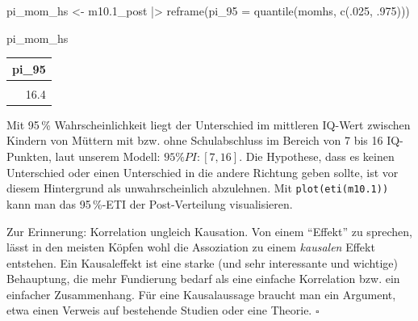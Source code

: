 \documentclass[
  ngerman,
  letterpaper,
  twoside,
  open=any]{scrbook}
\newenvironment{Shaded}{\begin{snugshade}}{\end{snugshade}}
\newcommand{\AttributeTok}[1]{\textcolor[rgb]{0.40,0.45,0.13}{#1}}
\newcommand{\DecValTok}[1]{\textcolor[rgb]{0.68,0.00,0.00}{#1}}
\newcommand{\FloatTok}[1]{\textcolor[rgb]{0.68,0.00,0.00}{#1}}
\newcommand{\FunctionTok}[1]{\textcolor[rgb]{0.28,0.35,0.67}{#1}}
\newcommand{\NormalTok}[1]{\textcolor[rgb]{0.00,0.23,0.31}{#1}}
\newcommand{\OtherTok}[1]{\textcolor[rgb]{0.00,0.23,0.31}{#1}}
\newcommand{\SpecialCharTok}[1]{\textcolor[rgb]{0.37,0.37,0.37}{#1}}
\newcounter{none} %
\theoremstyle{definition}
\theoremstyle{plain}
\theoremstyle{definition}
\theoremstyle{definition}
\theoremstyle{definition}
\theoremstyle{definition}
\theoremstyle{remark}
\begin{document}
\begin{Shaded}
\begin{Highlighting}[]
\NormalTok{pi\_mom\_hs }\OtherTok{\textless{}{-}}
\NormalTok{  m10}\FloatTok{.1}\NormalTok{\_post }\SpecialCharTok{|\textgreater{}}
  \FunctionTok{reframe}\NormalTok{(}\AttributeTok{pi\_95 =} \FunctionTok{quantile}\NormalTok{(momhs, }\FunctionTok{c}\NormalTok{(.}\DecValTok{025}\NormalTok{, .}\DecValTok{975}\NormalTok{)))}

\NormalTok{pi\_mom\_hs}
\end{Highlighting}
\end{Shaded}

{\def\LTcaptype{none} %
\begin{longtable}[]{@{}r@{}}
\toprule\noalign{}
pi\_95 \\
\midrule\noalign{}
\endhead
\bottomrule\noalign{}
\endlastfoot
7.3 \\
16.4 \\
\end{longtable}
}

Mit 95\,\% Wahrscheinlichkeit liegt der Unterschied im mittleren IQ-Wert
zwischen Kindern von Müttern mit bzw. ohne Schulabschluss im Bereich von
7 bis 16 IQ-Punkten, laut unserem Modell: \(95\%PI: [7,16]\). Die
Hypothese, dass es keinen Unterschied oder einen Unterschied in die
andere Richtung geben sollte, ist vor diesem Hintergrund als
unwahrscheinlich abzulehnen. Mit \texttt{plot(eti(m10.1))} kann man das
95\,\%-ETI der Post-Verteilung visualisieren.

\begin{tcolorbox}[enhanced jigsaw, arc=.35mm, bottomrule=.15mm, bottomtitle=1mm, breakable, colback=white, colbacktitle=quarto-callout-important-color!10!white, colframe=quarto-callout-important-color-frame, coltitle=black, left=2mm, leftrule=.75mm, opacityback=0, opacitybacktitle=0.6, rightrule=.15mm, title=\textcolor{quarto-callout-important-color}{\faExclamation}\hspace{0.5em}{Wichtig}, titlerule=0mm, toprule=.15mm, toptitle=1mm]

Zur Erinnerung: Korrelation ungleich Kausation. Von einem
\enquote{Effekt} zu sprechen, lässt in den meisten Köpfen wohl die
Assoziation zu einem \emph{kausalen} Effekt entstehen. Ein Kausaleffekt
ist eine starke (und sehr interessante und wichtige) Behauptung, die
mehr Fundierung bedarf als eine einfache Korrelation bzw. ein einfacher
Zusammenhang. Für eine Kausalaussage braucht man ein Argument, etwa
einen Verweis auf bestehende Studien oder eine Theorie. \(\square\)

\end{tcolorbox}
\end{document}
